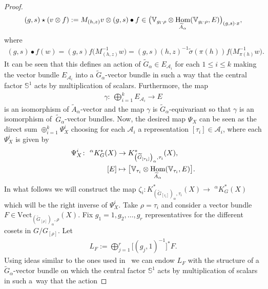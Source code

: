 \documentclass[11pt]{article}
\numberwithin{equation}{section}
\def\S{\mathbb{S}}
\def\V{\mathbb{V}}
\DeclareMathOperator{\Hom}{\textup{Hom}}
\theoremstyle{definition}
\numberwithin{equation}{section}
\begin{document}
\begin{proof}
\begin{gather*}
(g,s)\star (v\otimes f):=M_{(h,z)}v\otimes (g,s)\bullet
f \in \big(\V_{g_{l}\cdot\rho}\otimes
\Hom_{\widetilde{A}_{\alpha}}(\V_{g_{l}\cdot\rho},E)\big)_{(g,s)\cdot x},
\end{gather*}
where
\begin{gather*}
(g,s)\bullet f(w)=(g,s)f\big(M_{(h,z)}^{-1}w\big)
=(g,s)(h,z)^{-1}\tilde{\sigma}(\pi(h))f\big(M_{\pi(h)}^{-1}w\big).
\end{gather*}
It can be seen that this defines an action of $\widetilde{G}_{\alpha}\in E_{\mathcal{A}_{i}}$
for each $1\leq i\leq k$ making the vector bundle $E_{\mathcal{A}_{i}}$
into a $\widetilde{G}_{\alpha}$-vector bundle in such a way that the central factor
$\S^{1}$ acts by multiplication of scalars. Furthermore, the map
\begin{gather*}
\gamma\colon\ \bigoplus_{i=1}^{k}E_{\mathcal{A}_{i}} \rightarrow E
\end{gather*}
is an isomorphism of $\widetilde{A}_{\alpha}$-vector and the map $\gamma$ is
$\widetilde{G}_{\alpha}$-equivariant so that $\gamma$ is an isomorphism of~$\widetilde{G}_{\alpha}$-vector bundles. Now, the desired map $\Psi_{X}$ can be seen as the
direct sum $\oplus_{i=1}^{k}\Psi_{X}^{i}$ choosing for each $\mathcal{A}_{i}$ a representation
$[\tau_{i}]\in\mathcal{A}_{i}$, where each $\Psi_{X}^{i}$ is given by
\begin{align*}
\Psi_{X}^{i}\colon \phantom{i}^{\alpha}K_{G}^{\ast}(X)&\rightarrow
K^{*}_{\left(\widetilde{G}_{[\tau_{i}]}\right)_{\alpha},\tau_{i}}(X),
\\
[E]&\mapsto \big[\V_{\tau_{i}}\otimes\Hom_{\widetilde{A}_{\alpha}}(\V_{\tau_{i}},E)\big].
\end{align*}
In what follows we will construct the map
$\zeta_{i}\colon K^{*}_{\left(\widetilde{G}_{[\tau_{i}]}\right)_{\alpha},\tau_{i}}(X)
\rightarrow \phantom{i}^{\alpha}K_{G}^{\ast}(X)$
which will be the right inverse of $\Psi_{X}^{i}$. Take $\rho=\tau_{i}$ and consider
a vector bundle $F\in\text{Vect}_{\left(\widetilde{G}_{[\rho]}\right)_{\alpha},\rho}(X)$.
Fix $g_{1}=1,g_{2},\dots,g_{r}$ representatives for the different cosets in $G/G_{[\rho]}$.
Let
\begin{gather*}
L_{F}:=\bigoplus_{j=1}^{r}\big[(g_{j},1)^{-1}\big]^{\ast} F.
\end{gather*}
Using ideas similar to the ones used in~\cite[Theorem 3.1]{GomezUribe} we can endow $L_{F}$
with the structure of a $\widetilde{G}_{\alpha}$-vector bundle on which the
central factor $\S^{1}$ acts by multiplication of scalars in such a~way that the action

\end{proof}
\end{document}

